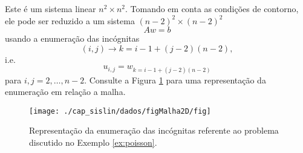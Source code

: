 \begin{ex}
  Este é um sistema linear $n^2 \times n^2$. Tomando em conta as condições de contorno, ele pode ser reduzido a um sistema $(n-2)^2\times (n-2)^2$
  \begin{equation}
    Aw = b
  \end{equation}
  usando a enumeração das incógnitas 
  \begin{equation}
    (i,j) \rightarrow k=i-1 + (j-2)(n-2), 
  \end{equation}
  i.e.
  \begin{equation}
    u_{i,j} = w_{k=i-1 + (j-2)(n-2)}
  \end{equation}
para $i,j=2,\dotsc,n-2$. Consulte a Figura \ref{fig:malha2d} para uma representação da enumeração em relação a malha.

  \begin{figure}[H]
    \centering
    \texttt{[image: ./cap\_sislin/dados/figMalha2D/fig]}
    \caption{Representação da enumeração das incógnitas referente ao problema discutido no Exemplo \ref{ex:poisson}.}
    \label{fig:malha2d}
  \end{figure}


\end{ex}
